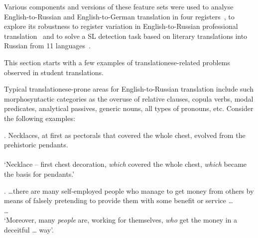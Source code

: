 Various components and versions of these feature sets were used to analyse English-to-Russian and English-to-German translation in four registers~\cite{Kunilovskaya2020vars}, to explore its robustness to register variation in English-to-Russian professional translation~\cite{Kunilovskaya2021regs} and to solve a SL detection task based on literary translations into Russian from 11 languages~\cite{Kunilovskaya2021ranlp}.

This section starts with a few examples of translationese-related problems observed in student translations.

Typical translationese-prone areas for English-to-Russian translation include such morphosyntactic categories as the overuse of relative clauses, copula verbs, modal predicates, analytical passives, generic nouns, all types of pronouns, etc. Consider the following examples:


\ex. \label{ex:functionw}\hspace{1pt}
Necklaces, at ﬁrst as pectorals that covered the whole chest, evolved from the prehistoric pendants.\\
\\
`Necklace -- ﬁrst chest decoration, \textit{which} covered the whole chest, \textit{which} became the basis for pendants.'

\ex. \label{ex:generic}\hspace{1pt}
\dots there are many self-employed people who manage to get money from others by means
of falsely pretending to provide them with some benefit or service \dots \\
  \dots \\
`Moreover, many \textit{people} are, working for themselves, \textit{who} get the money in a deceitful  \dots 
way'.

